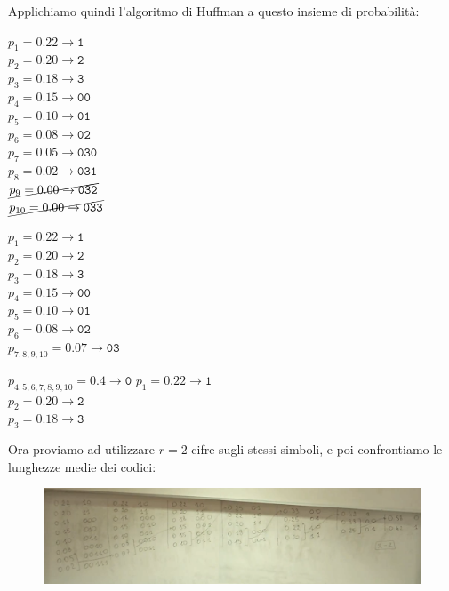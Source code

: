 \newpage
Applichiamo quindi l'algoritmo di Huffman a questo insieme di probabilità:

\begin{multicols}{3}
	
	\begin{center}
		$p_1=0.22 \rightarrow \texttt{1}$\\
		$p_2=0.20 \rightarrow \texttt{2}$\\
		$p_3=0.18 \rightarrow \texttt{3}$\\
		$p_4=0.15 \rightarrow \texttt{00}$\\
		$p_5=0.10 \rightarrow \texttt{01}$\\
		$p_6=0.08 \rightarrow \texttt{02}$\\
		$p_7=0.05 \rightarrow \texttt{030}$\\
		$p_8=0.02 \rightarrow \texttt{031}$\\
		$\cancel{p_9=0.00 \rightarrow \texttt{032}}$\\
		$\cancel{p_{10}=0.00 \rightarrow \texttt{033}}$
	\end{center}
	
	\columnbreak
	
	\begin{center}
		$p_1=0.22 \rightarrow \texttt{1}$\\
		$p_2=0.20 \rightarrow \texttt{2}$\\
		$p_3=0.18 \rightarrow \texttt{3}$\\
		$p_4=0.15 \rightarrow \texttt{00}$\\
		$p_5=0.10 \rightarrow \texttt{01}$\\
		$p_6=0.08 \rightarrow \texttt{02}$\\
		$p_{7, 8, 9, 10}=0.07 \rightarrow \texttt{03}$
	\end{center}  

\columnbreak

\begin{center}
	$p_{4, 5, 6, 7, 8, 9, 10}=0.4 \rightarrow \texttt{0}$
	$p_1=0.22 \rightarrow \texttt{1}$\\
	$p_2=0.20 \rightarrow \texttt{2}$\\
	$p_3=0.18 \rightarrow \texttt{3}$\\
\end{center}  		
\end{multicols}

Ora proviamo ad utilizzare $r=2$ cifre sugli stessi simboli, e poi confrontiamo le lunghezze medie dei codici:

\begin{figure}[h]
	\centering
	\includegraphics[width=\linewidth]{immagini/img22}
\end{figure}

